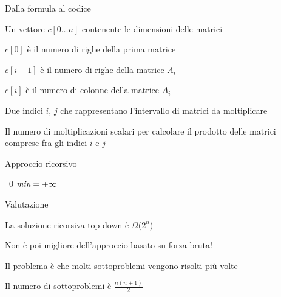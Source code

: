 \begin{frame}{Dalla formula al codice}

\vspace{-9pt}
\begin{myboxtitle}[Input]
\BIL
\item Un vettore $c[0 \ldots n]$ contenente le dimensioni delle matrici
\BI
\item $c[0]$ è il numero di righe della prima matrice
\item $c[i-1]$ è il numero di righe della matrice $A_i$
\item $c[i]$ è il numero di colonne della matrice $A_i$
\EI
\item Due indici $i$, $j$ che rappresentano l'intervallo di matrici da moltiplicare
\EIL
\end{myboxtitle}

\begin{myboxtitle}[Output]
Il numero di moltiplicazioni scalari per calcolare il prodotto delle matrici comprese fra gli indici $i$ e $j$
\end{myboxtitle}

\end{frame}

\begin{frame}{Approccio ricorsivo}

\vspace{-9pt}
\begin{Procedure}
\caption[A]{\INTEGER {}($\INTEGER[\,]\ c$, \INTEGER $i$, \INTEGER $j$)}
{ \Return\ $0$\; }
{
  $\textit{min} = +\infty$\;
  \Return \Min\;
}
\end{Procedure}


\end{frame}

\begin{frame}{Valutazione}

\vspace{-9pt}
\BIL
\item La soluzione ricorsiva top-down è $\Omega(2^n$)
\item Non è poi migliore dell'approccio basato su forza bruta!
\item Il problema è che molti sottoproblemi vengono risolti più volte
\item Il numero di sottoproblemi è $\frac{n(n+1)}{2}$
\EIL

\end{frame}


